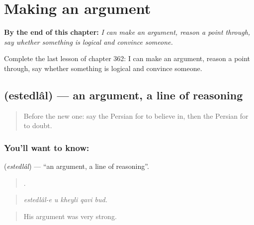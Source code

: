 
\chapter{Making an argument}
\label{ch:fa-making-an-argument}

\begin{chapteropening}
\textbf{By the end of this chapter:} \emph{I can make an argument, reason a point through, say whether something is logical and convince someone.}

Complete the last lesson of chapter 362: I can make an argument, reason a point through, say whether something is logical and convince someone.
\end{chapteropening}

\section[\texorpdfstring{\fa{استدلال} (estedlâl)}{استدلال (estedlâl)}]{ (estedlâl) — an argument, a line of reasoning}

\label{lesson:FA-C362-estedlal}



\begin{quote}
Before the new one: say the Persian for to believe in, then the Persian for to doubt.
\end{quote}

\subsection*{You'll want to know: }
\textbf{} (\emph{estedlâl}) — \textquotedblleft{}an argument, a line of reasoning\textquotedblright{}.

\begin{quote}
    .
\end{quote}

\begin{quote}
\emph{estedlâl-e u kheyli qavi bud.}
\end{quote}

\begin{quote}
His argument was very strong.
\end{quote}

